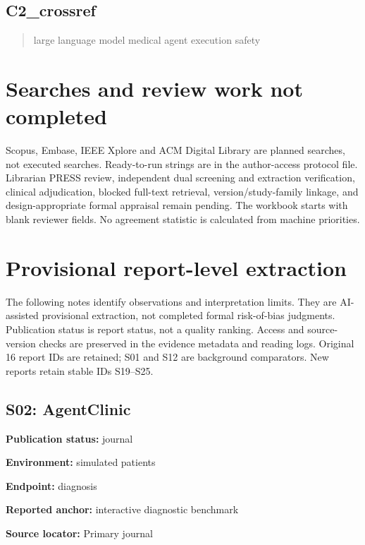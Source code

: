 \documentclass[journal,onecolumn,10pt]{IEEEtran}
\begin{document}
\subsection*{C2\_crossref}
\begin{quote}\small\raggedright large language model medical agent execution safety\end{quote}


\section{Searches and review work not completed}
Scopus, Embase, IEEE Xplore and ACM Digital Library are planned searches, not executed searches. Ready-to-run strings are in the author-access protocol file. Librarian PRESS review, independent dual screening and extraction verification, clinical adjudication, blocked full-text retrieval, version/study-family linkage, and design-appropriate formal appraisal remain pending. The workbook starts with blank reviewer fields. No agreement statistic is calculated from machine priorities.
\section{Provisional report-level extraction}
The following notes identify observations and interpretation limits. They are AI-assisted provisional extraction, not completed formal risk-of-bias judgments. Publication status is report status, not a quality ranking. Access and source-version checks are preserved in the evidence metadata and reading logs. Original 16 report IDs are retained; S01 and S12 are background comparators. New reports retain stable IDs S19--S25.

\subsection*{S02: AgentClinic}

\noindent\textbf{Publication status:} journal\par

\noindent\textbf{Environment:} simulated patients\par

\noindent\textbf{Endpoint:} diagnosis\par

\noindent\textbf{Reported anchor:} interactive diagnostic benchmark\par

\noindent\textbf{Source locator:} Primary journal\par
\end{document}
